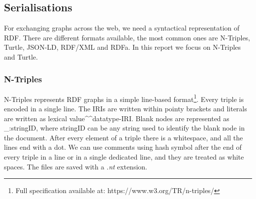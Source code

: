 

\subsection{Serialisations}
For exchanging graphs across the web, we need a syntactical representation of RDF. There are different formats available, the most common ones are N-Triples, Turtle, JSON-LD, RDF/XML and RDFa. In this report we focus on N-Triples and Turtle.

\subsubsection{N-Triples}
N-Triples represents RDF graphs in a simple line-based format\footnote{Full specification available at: https://www.w3.org/TR/n-triples/}. Every triple is encoded in a single line. The IRIs are written within pointy brackets and literals are written as lexical value\textasciicircum \textasciicircum datatype-IRI. Blank nodes are represented as \_:stringID, where stringID can be any string used to identify the blank node in the document. After every element of a triple there is a whitespace, and all the lines end with a dot. We can use comments using hash symbol after the end of every triple in a line or in a single dedicated line, and they are treated as white spaces. The files are saved with a \textit{.nt} extension.

